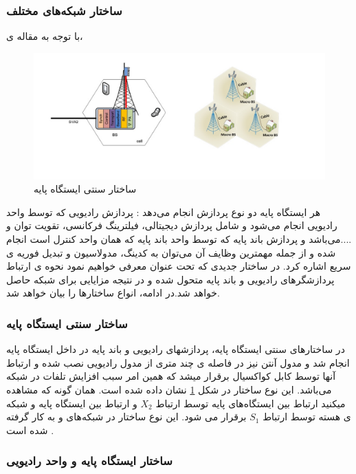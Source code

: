 \subsubsection{ساختار شبکه‌های مختلف }
با توجه به مقاله ی\cite{checko2015cloud}،
\begin{figure}
  \centering
    \includegraphics[scale=0.7]{./fig/c11}
  \caption{ساختار سنتی ایستگاه پایه \cite{checko2015cloud}}
  \label{fig:c11}
\end{figure}
هر ایستگاه پایه دو نوع پردازش انجام می‌دهد : پردازش
رادیویی که توسط واحد رادیویی  انجام می‌شود و شامل پردازش
دیجیتالی، فیلترینگ فرکانسی، تقویت توان و ....می‌باشد و
پردازش باند پایه که توسط واحد باند پایه  که همان واحد کنترل است  انجام شده و از جمله
مهمترین وظایف آن می‌توان به کدینگ، مدولاسیون و
تبدیل فوریه ی سریع اشاره کرد. در ساختار جدیدی که
تحت عنوان   معرفی خواهیم نمود نحوه ی ارتباط
پردازشگرهای رادیویی و باند پایه متحول شده و در نتیجه
مزایایی برای شبکه حاصل خواهد شد.در ادامه، انواع ساختارها را بیان خواهد شد.
\subsubsection{ساختار سنتی ایستگاه پایه }

در ساختارهای سنتی ایستگاه پایه، پردازشهای رادیویی و باند پایه در
داخل ایستگاه پایه انجام ‌شد و مدول آنتن نیز در فاصله
ی چند متری از مدول رادیویی نصب شده و ارتباط آنها
توسط کابل کواکسیال برقرار میشد که همین امر سبب
افزایش تلفات در شبکه می‌باشد. این نوع ساختار در شکل
\ref{fig:c11} نشان داده شده است. همان گونه که مشاهده میکنید
ارتباط بین ایستگاه‌های پایه توسط ارتباط  $X_2$ و ارتباط بین
ایستگاه پایه و شبکه ی هسته توسط ارتباط $ S_1$ برقرار می
شود. این نوع ساختار در شبکه‌های  و  به کار گرفته
شده است 
\cite{checko2015cloud}.

\subsubsection{ ساختار ایستگاه پایه و واحد رادیویی}

